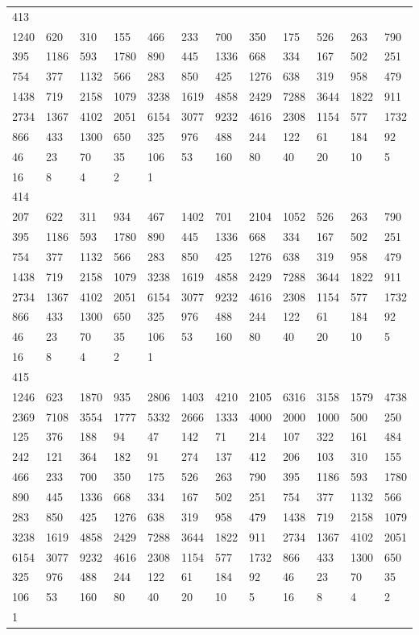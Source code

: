 \begin{longtable}{llllllllllll}
413&&&&&&&&&&&\\
1240& 620& 310& 155& 466& 233& 700& 350& 175& 526& 263& 790\\
395& 1186& 593& 1780& 890& 445& 1336& 668& 334& 167& 502& 251\\
754& 377& 1132& 566& 283& 850& 425& 1276& 638& 319& 958& 479\\
1438& 719& 2158& 1079& 3238& 1619& 4858& 2429& 7288& 3644& 1822& 911\\
2734& 1367& 4102& 2051& 6154& 3077& 9232& 4616& 2308& 1154& 577& 1732\\
866& 433& 1300& 650& 325& 976& 488& 244& 122& 61& 184& 92\\
46& 23& 70& 35& 106& 53& 160& 80& 40& 20& 10& 5\\
16& 8& 4& 2& 1& \\

414&&&&&&&&&&&\\
207& 622& 311& 934& 467& 1402& 701& 2104& 1052& 526& 263& 790\\
395& 1186& 593& 1780& 890& 445& 1336& 668& 334& 167& 502& 251\\
754& 377& 1132& 566& 283& 850& 425& 1276& 638& 319& 958& 479\\
1438& 719& 2158& 1079& 3238& 1619& 4858& 2429& 7288& 3644& 1822& 911\\
2734& 1367& 4102& 2051& 6154& 3077& 9232& 4616& 2308& 1154& 577& 1732\\
866& 433& 1300& 650& 325& 976& 488& 244& 122& 61& 184& 92\\
46& 23& 70& 35& 106& 53& 160& 80& 40& 20& 10& 5\\
16& 8& 4& 2& 1& \\

415&&&&&&&&&&&\\
1246& 623& 1870& 935& 2806& 1403& 4210& 2105& 6316& 3158& 1579& 4738\\
2369& 7108& 3554& 1777& 5332& 2666& 1333& 4000& 2000& 1000& 500& 250\\
125& 376& 188& 94& 47& 142& 71& 214& 107& 322& 161& 484\\
242& 121& 364& 182& 91& 274& 137& 412& 206& 103& 310& 155\\
466& 233& 700& 350& 175& 526& 263& 790& 395& 1186& 593& 1780\\
890& 445& 1336& 668& 334& 167& 502& 251& 754& 377& 1132& 566\\
283& 850& 425& 1276& 638& 319& 958& 479& 1438& 719& 2158& 1079\\
3238& 1619& 4858& 2429& 7288& 3644& 1822& 911& 2734& 1367& 4102& 2051\\
6154& 3077& 9232& 4616& 2308& 1154& 577& 1732& 866& 433& 1300& 650\\
325& 976& 488& 244& 122& 61& 184& 92& 46& 23& 70& 35\\
106& 53& 160& 80& 40& 20& 10& 5& 16& 8& 4& 2\\
1& \\


\end{longtable}
